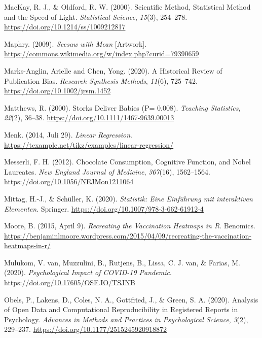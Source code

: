 \documentclass[
  letterpaper,
  oneside,
  open=any]{scrbook}
\newlength{\cslhangindent}
\newenvironment{CSLReferences}[2] %
 {\begin{list}{}{%
  \setlength{\itemindent}{0pt}
  \setlength{\leftmargin}{0pt}
  \setlength{\parsep}{0pt}
  \ifodd #1
   \setlength{\leftmargin}{\cslhangindent}
   \setlength{\itemindent}{-1\cslhangindent}
  \fi
  \setlength{\itemsep}{#2\baselineskip}}}
 {\end{list}}
\theoremstyle{definition}
\theoremstyle{definition}
\theoremstyle{definition}
\theoremstyle{remark}
\begin{document}
\begin{CSLReferences}{1}{0}
MacKay, R. J., \& Oldford, R. W. (2000). Scientific {Method},
{Statistical Method} and the {Speed} of {Light}. \emph{Statistical
Science}, \emph{15}(3), 254--278.
\url{https://doi.org/10.1214/ss/1009212817}

Maphry. (2009). \emph{Seesaw with Mean} {[}Artwork{]}.
\url{https://commons.wikimedia.org/w/index.php?curid=79390659}

Marks-Anglin, Arielle and Chen, Yong. (2020). A Historical Review of
Publication Bias. \emph{Research Synthesis Methods}, \emph{11}(6),
725--742. \url{https://doi.org/10.1002/jrsm.1452}

Matthews, R. (2000). Storks {Deliver Babies} (P= 0.008). \emph{Teaching
Statistics}, \emph{22}(2), 36--38.
\url{https://doi.org/10.1111/1467-9639.00013}

Menk. (2014, Juli 29). \emph{Linear Regression}.
\url{https://texample.net/tikz/examples/linear-regression/}

Messerli, F. H. (2012). Chocolate {Consumption}, {Cognitive Function},
and {Nobel Laureates}. \emph{New England Journal of Medicine},
\emph{367}(16), 1562--1564. \url{https://doi.org/10.1056/NEJMon1211064}

Mittag, H.-J., \& Schüller, K. (2020). \emph{Statistik: Eine Einführung
mit interaktiven Elementen}. Springer.
\url{https://doi.org/10.1007/978-3-662-61912-4}

Moore, B. (2015, April 9). \emph{Recreating the Vaccination Heatmaps in
{R}}. Benomics.
\url{https://benjaminlmoore.wordpress.com/2015/04/09/recreating-the-vaccination-heatmaps-in-r/}

Mulukom, V. van, Muzzulini, B., Rutjens, B., Lissa, C. J. van, \&
Farias, M. (2020). \emph{Psychological Impact of {COVID-19} Pandemic}.
\url{https://doi.org/10.17605/OSF.IO/TSJNB}

Obels, P., Lakens, D., Coles, N. A., Gottfried, J., \& Green, S. A.
(2020). Analysis of {Open Data} and {Computational Reproducibility} in
{Registered Reports} in {Psychology}. \emph{Advances in Methods and
Practices in Psychological Science}, \emph{3}(2), 229--237.
\url{https://doi.org/10.1177/2515245920918872}


\end{CSLReferences}
\end{document}
